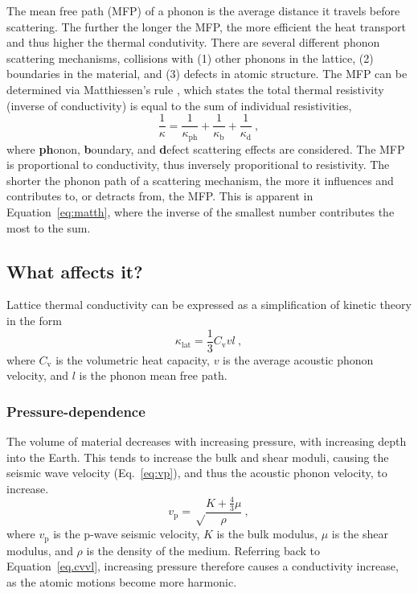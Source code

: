 The mean free path (MFP) of a phonon is the average distance it travels before scattering. The further the longer the MFP, the more efficient the heat transport and thus higher the thermal condutivity. There are several different phonon scattering mechanisms, collisions with (1) other phonons in the lattice, (2) boundaries in the material, and (3) defects in atomic structure. The MFP can be determined via Matthiessen's rule \citep[see][]{Klemens1959}, which states the total thermal resistivity (inverse of conductivity) is equal to the sum of individual resistivities,
%
\begin{equation}
\frac{1}{\kappa} = \frac{1}{\kappa_{\mathrm{ph}}} + \frac{1}{\kappa_{\mathrm{b}}} + \frac{1}{\kappa_{\mathrm{d}}}\ ,
\label{eq:matth}
\end{equation}
%
where \textbf{ph}onon, \textbf{b}oundary, and \textbf{d}efect scattering effects are considered. The MFP is proportional to conductivity, thus inversely proporitional to resistivity. The shorter the phonon path of a scattering mechanism, the more it influences and contributes to, or detracts from, the MFP. This is apparent in Equation~\ref{eq:matth}, where the inverse of the smallest number contributes the most to the sum.






\subsection{What affects it?}

Lattice thermal conductivity can be expressed \citep[e.g.][]{Schelling2002, Stackhouse2010a} as a simplification of kinetic theory in the form 
%
\begin{equation}
\kappa_{\mathrm{lat}} = \frac{1}{3} C_{\mathrm{v}} v l\ ,
\label{eq.cvvl}
\end{equation}
%
where $C_{\mathrm{v}}$ is the volumetric heat capacity, $v$ is the average acoustic phonon velocity, and $l$ is the phonon mean free path.


\subsubsection{Pressure-dependence}

The volume of material decreases with increasing pressure, with increasing depth into the Earth. This tends to increase the bulk and shear moduli, causing the seismic wave velocity (Eq.~\ref{eq:vp}), and thus the acoustic phonon velocity, to increase. 
%
\begin{equation}
v_{\mathrm{p}} = \sqrt \frac{K+\frac{4}{3}\mu}{\rho}\ ,
\label{eq:vp}
\end{equation}
%
where $v_{\mathrm{p}}$ is the p-wave seismic velocity, $K$ is the bulk modulus, $\mu$ is the shear modulus, and $\rho$ is the density of the medium. Referring back to Equation~\ref{eq.cvvl}, increasing pressure therefore causes a conductivity increase, as the atomic motions become more harmonic. 

